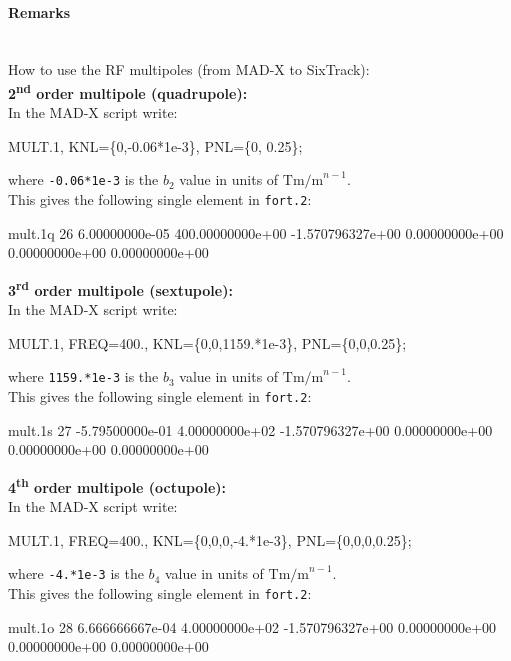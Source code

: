 \paragraph{Remarks}~\\
How to use the RF multipoles (from MAD-X to SixTrack):\\

\noindent\textbf{2\textsuperscript{nd} order multipole (quadrupole):}\\
\noindent In the MAD-X script write:
\begin{ctverbatim}
MULT.1, KNL=\{0,-0.06*1e-3\}, PNL=\{0, 0.25\};
\end{ctverbatim}
where \texttt{-0.06*1e-3} is the $b_2$ value in units of $\mathrm{Tm/m}^{n-1}$.\\
This gives the following single element in \texttt{fort.2}:
\begin{ctverbatim}
mult.1q  26  6.00000000e-05  400.00000000e+00  -1.570796327e+00  0.00000000e+00  0.00000000e+00  0.00000000e+00
\end{ctverbatim}

\noindent\textbf{3\textsuperscript{rd} order multipole (sextupole):}\\
\noindent In the MAD-X script write:
\begin{ctverbatim}
MULT.1, FREQ=400., KNL=\{0,0,1159.*1e-3\}, PNL=\{0,0,0.25\};
\end{ctverbatim}
where \texttt{1159.*1e-3} is the $b_3$ value in units of $\mathrm{Tm/m}^{n-1}$.\\
This gives the following single element in \texttt{fort.2}:
\begin{ctverbatim}
mult.1s  27 -5.79500000e-01  4.00000000e+02  -1.570796327e+00  0.00000000e+00  0.00000000e+00  0.00000000e+00
\end{ctverbatim}

\noindent\textbf{4\textsuperscript{th} order multipole (octupole):}\\
\noindent In  the MAD-X script write:
\begin{ctverbatim}
MULT.1, FREQ=400., KNL=\{0,0,0,-4.*1e-3\}, PNL=\{0,0,0,0.25\};
\end{ctverbatim}
where \texttt{-4.*1e-3} is the $b_4$ value in units of $\mathrm{Tm/m}^{n-1}$.\\
This gives the following single element in \texttt{fort.2}:
\begin{ctverbatim}
mult.1o  28  6.666666667e-04  4.00000000e+02  -1.570796327e+00  0.00000000e+00  0.00000000e+00  0.00000000e+00
\end{ctverbatim}

